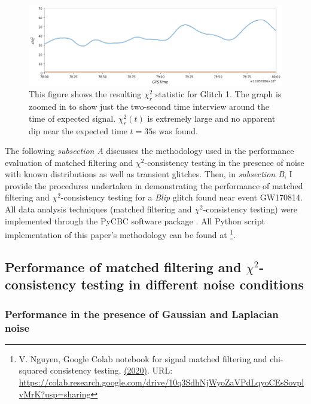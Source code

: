 \documentclass[preprint,
letterpaper,
 amsmath,amssymb,
 aps,
]{revtex4-2}
\begin{document}
\begin{figure}[t]
\includegraphics[width = .9\textwidth]{chi2 glitch 1.png}
\caption{This figure shows the resulting $\chi^2_r$ statistic for Glitch 1. The graph is zoomed in to show just the two-second time interview around the time of expected signal. $\chi_r^2(t)$ is extremely large and no apparent dip near the expected time $t=35$s was found.}
\centering
\end{figure} 

The following \textit{subsection A} discusses the methodology used in the performance evaluation of matched filtering and $\chi^2$-consistency testing in the presence of noise with known distributions as well as transient glitches. Then, in \textit{subsection B}, I provide the procedures undertaken in demonstrating the performance of matched filtering and $\chi^2$-consistency testing for a \textit{Blip} glitch found near event GW170814. All data analysis techniques (matched filtering and $\chi^2$-consistency testing) were implemented through the PyCBC software package \cite{pycbc}. All Python script implementation of this paper's methodology can be found at \footnote{V. Nguyen, Google Colab notebook for signal matched filtering and chi-squared consistency testing, \href{https://colab.research.google.com/drive/10q3SdhNjWyoZaVPdLqyoCEsSovplvMrK?authuser=2#scrollTo=7cafQoPiH5Sy}{(2020)}. URL: \url{https://colab.research.google.com/drive/10q3SdhNjWyoZaVPdLqyoCEsSovplvMrK?usp=sharing}}.

\subsection{Performance of matched filtering and $\chi^2$-consistency testing in different noise conditions}

\subsubsection{Performance in the presence of Gaussian and Laplacian noise} \label{gaussian}
\end{document}
